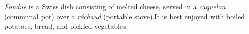 \emph{Fondue} is a Swiss dish consisting of melted cheese, served in a \emph{caquelon} (communal pot) over a \emph{réchaud} (portable stove).It is best enjoyed with boiled potatoes, bread, and pickled vegetables.

